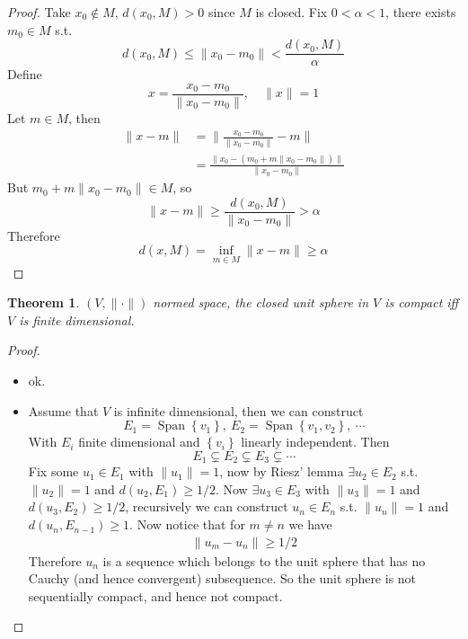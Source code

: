 \documentclass[11pt,a4paper]{article}
\theoremstyle{definition}
\theoremstyle{plain}
\newtheorem{theorem}[definition]{Theorem}
\theoremstyle{remark}
\renewcommand{\set}[1]{\left\{ #1 \right\}}
\newcommand{\norm}[1]{\lVert #1 \rVert}
\newcommand{\1}{\mathbbm{1}}
\newcommand{\Span}{\operatorname{Span}}
\begin{document}
\begin{proof}
    Take $x_0 \not\in M$, $d(x_0, M) > 0$ since $M$ is closed. Fix $0 < \alpha < 1$, there exists $m_0 \in M$ s.t. 
    $$ d(x_0, M) \le \norm{x_0 - m_0} < \frac{d(x_0,M)}{\alpha}$$
    Define 
    $$x = \frac{x_0 - m_0}{\norm{x_0-m_0}}, \quad \norm{x} = 1$$
    Let $m \in M$, then 
    \begin{align*}
        \norm{x-m} &= \norm{\frac{x_0 - m_0}{\norm{x_0-m_0}} - m} \\
        &= \frac{\norm{x_0 - (m_0 + m \norm{x_0 - m_0})}}{\norm{x_0 - m_0}}
    \end{align*} 
    But $m_0 + m \norm{x_0 - m_0} \in M$, so 
    $$\norm{x-m} \ge \frac{d(x_0, M)}{\norm{x_0 - m_0}} > \alpha$$
    Therefore 
    $$d(x, M) = \inf_{m \in M} \norm{x-m} \ge \alpha$$
\end{proof}

\begin{theorem}
    $(V, \norm{\cdot})$ normed space, the closed unit sphere in $V$ is compact iff $V$ is finite dimensional.
\end{theorem}


\begin{proof}
    \begin{itemize}
        \item[$\impliedby$] ok. 
        
        \item[$\implies$] Assume that $V$ is infinite dimensional, then we can construct 
        $$E_1 = \Span \set{v_1}, \ E_2 = \Span \set{v_1, v_2}, \ \cdots$$
        With $E_i$ finite dimensional and $\set{v_i}$ linearly independent. Then 
        $$E_1 \subsetneq E_2 \subsetneq E_3 \subsetneq \cdots$$
        Fix some $u_1 \in E_1$ with $\norm{u_1} = 1$, now by Riesz' lemma $\exists u_2 \in E_2$ s.t. $\norm{u_2} = 1$ and 
        $d(u_2, E_1) \ge 1/2$. Now $\exists u_3 \in E_3$ with $\norm{u_3} = 1$ and $d(u_3, E_2) \ge 1/2$, recursively we can construct $u_n \in E_n$ s.t. 
        $\norm{u_n} = 1$ and $d(u_n, E_{n-1}) \ge 1$. Now notice that for $m \ne n$ we have 
        \begin{align*}
            \norm{u_m - u_n} \ge 1/2
        \end{align*}
        Therefore $u_n$ is a sequence which belongs to the unit sphere that has no Cauchy (and hence convergent) subsequence. So the unit sphere is not sequentially compact, and hence not compact.
    \end{itemize}
\end{proof}
\end{document}
